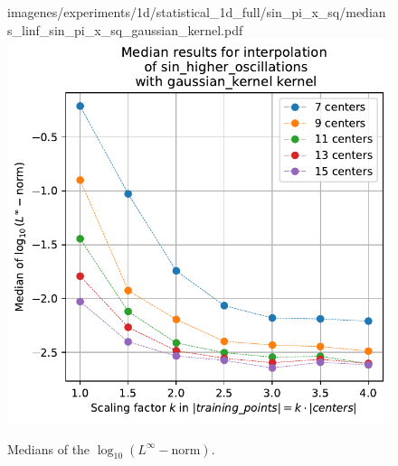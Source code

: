 \documentclass[12pt]{report} %
\begin{document}
\begin{figure}[H]
{    {imagenes/experiments/1d/statistical_1d_full/sin_pi_x_sq/medians_linf_sin_pi_x_sq_gaussian_kernel.pdf}}
  {\includegraphics[height=.45\textwidth]
    {imagenes/experiments/1d/statistical_1d_full/sin_higher_oscillations/medians_linf_sin_higher_oscillations_gaussian_kernel.pdf}}
  \caption{Medians of the $\log_{10}(L^\infty-\text{norm})$.}
  \label{fig:medians-linf-statistic}
\end{figure}
\end{document}
